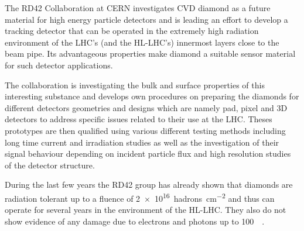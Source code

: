 
The RD42 Collaboration at CERN investigates \ac{CVD} diamond as a future material for high energy particle detectors and is leading an effort to develop a tracking detector that can be operated in the extremely high radiation environment of the LHC's (and the HL-LHC's) innermost layers close to the beam pipe. Its advantageous properties make diamond a suitable sensor material for such detector applications.\par
The collaboration is investigating the bulk and surface properties of this interesting substance and develops own procedures on preparing the diamonds for different detectors geometries and designs which are namely pad, pixel and 3D detectors to address specific issues related to their use at the LHC. Theses prototypes are then qualified using various different testing methods including long time current and irradiation studies as well as the investigation of their signal behaviour depending on incident particle flux and high resolution studies of the detector structure.\par
During the last few years the RD42 group has already shown that diamonds are radiation tolerant up to a fluence of \SI{2e16}{hadrons\per\centi\meter^2} and thus can operate for several years in the environment of the HL-LHC. They also do not show evidence of any damage due to electrons and photons up to \SI{100}{\mega\rad}.\parend